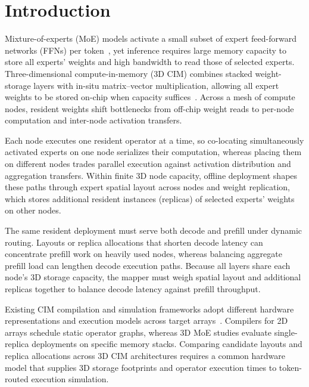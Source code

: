 \section{Introduction}
\label{sec:introduction}

Mixture-of-experts (MoE) models activate a small subset of expert feed-forward networks (FFNs) per token~\cite{switch2022}, yet inference requires large memory capacity to store all experts' weights and high bandwidth to read those of selected experts. Three-dimensional compute-in-memory (3D CIM) combines stacked weight-storage layers with in-situ matrix--vector multiplication, allowing all expert weights to be stored on-chip when capacity suffices~\cite{buchel2025,jang2025,lee2022}. Across a mesh of compute nodes, resident weights shift bottlenecks from off-chip weight reads to per-node computation and inter-node activation transfers.

Each node executes one resident operator at a time, so co-locating simultaneously activated experts on one node serializes their computation, whereas placing them on different nodes trades parallel execution against activation distribution and aggregation transfers. Within finite 3D node capacity, offline deployment shapes these paths through expert spatial layout across nodes and weight replication, which stores additional resident instances (replicas) of selected experts' weights on other nodes.

The same resident deployment must serve both decode and prefill under dynamic routing. Layouts or replica allocations that shorten decode latency can concentrate prefill work on heavily used nodes, whereas balancing aggregate prefill load can lengthen decode execution paths. Because all layers share each node's 3D storage capacity, the mapper must weigh spatial layout and additional replicas together to balance decode latency against prefill throughput.

Existing CIM compilation and simulation frameworks adopt different hardware representations and execution models across target arrays~\cite{pimcomp2023,cimmlc2024,cimflow2025,buchel2025,sharma2025}. Compilers for 2D arrays schedule static operator graphs, whereas 3D MoE studies evaluate single-replica deployments on specific memory stacks. Comparing candidate layouts and replica allocations across 3D CIM architectures requires a common hardware model that supplies 3D storage footprints and operator execution times to token-routed execution simulation.

